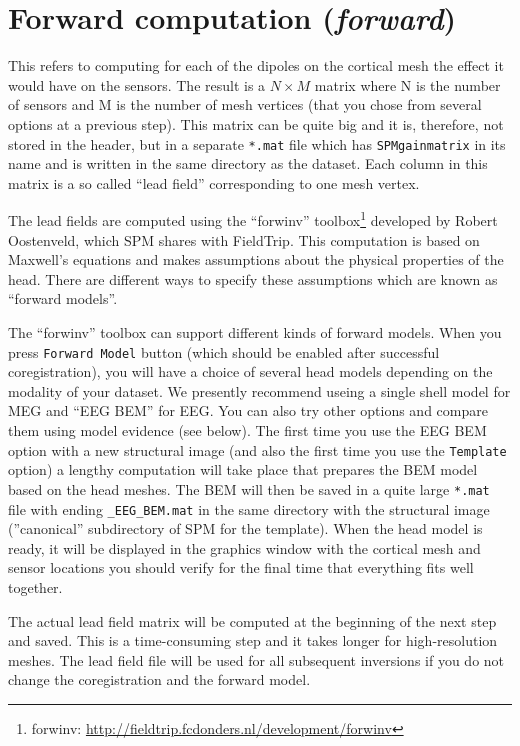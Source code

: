 \section{Forward computation (\textit{forward})}
This refers to computing for each of the dipoles on the cortical mesh the effect it would have on the sensors. The result is a $N \times M$ matrix where N is the number of sensors and M is the number of mesh vertices (that you chose from several options at a previous step). This matrix can be quite big and it is, therefore, not stored in the header, but in a separate \texttt{*.mat} file which has \texttt{SPMgainmatrix} in its name and is written in the same directory as the dataset. Each column in this matrix is a so called ``lead field'' corresponding to one mesh vertex.

The lead fields are computed using the ``forwinv'' toolbox\footnote{forwinv: \url{http://fieldtrip.fcdonders.nl/development/forwinv}} developed by Robert Oostenveld, which SPM shares with FieldTrip. This computation is based on Maxwell's equations and makes assumptions about the physical properties of the head. There are different ways to specify these assumptions which are known as ``forward models''.

The ``forwinv'' toolbox can support different kinds of forward models. When you press \texttt{Forward Model} button (which should be enabled after successful coregistration), you will have a choice of several head models depending on the modality of your dataset. We presently recommend useing a single shell model for MEG and ``EEG BEM'' for EEG. You can also try other options and compare them using model evidence (see below). The first time you use the EEG BEM option with a new structural image (and also the first time you use the \texttt{Template} option) a lengthy computation will take place that prepares the BEM model based on the head meshes. The BEM will then be saved in a quite large \texttt{*.mat} file with ending \texttt{\_EEG\_BEM.mat} in the same directory with the structural image (''canonical'' subdirectory of SPM for the template). When the head model is ready, it will be displayed in the graphics window with the cortical mesh and sensor locations you should verify for the final time that everything fits well together.

The actual lead field matrix will be computed at the beginning of the next step and saved. This is a time-consuming step and it takes longer for high-resolution meshes. The lead field file will be used for all subsequent inversions if you do not change the coregistration and the forward model.


